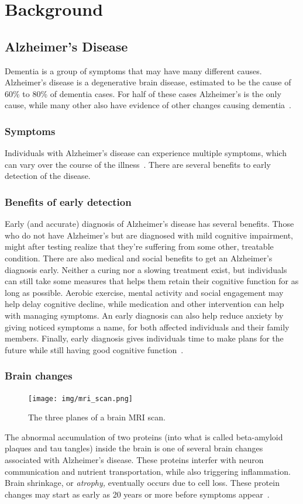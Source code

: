 \documentclass{kththesis}
\begin{document}
\chapter{Background}

\section{Alzheimer's Disease}

Dementia is a group of symptoms that may have many different causes. Alzheimer's disease is a degenerative brain disease, estimated to be the cause of 60\% to 80\% of dementia cases. For half of these cases Alzheimer's is the only cause, while many other also have evidence of other changes causing dementia~\cite{factsfigures2018}.

\subsection{Symptoms}
Individuals with Alzheimer's disease can experience multiple symptoms, which can vary over the course of the illness~\cite{factsfigures2018}. There are several benefits to early detection of the disease.

\subsection{Benefits of early detection}
Early (and accurate) diagnosis of Alzheimer's disease has several benefits. Those who do not have Alzheimer's but are diagnosed with mild cognitive impairment, might after testing realize that they're suffering from some other, treatable condition. There are also medical and social benefits to get an Alzheimer's diagnosis early. Neither a curing nor a slowing treatment exist, but individuals can still take some measures that helps them retain their cognitive function for as long as possible. Aerobic exercise, mental activity and social engagement may help delay cognitive decline, while medication and other intervention can help with managing symptoms. An early diagnosis can also help reduce anxiety by giving noticed symptoms a name, for both affected individuals and their family members. Finally, early diagnosis gives individuals time to make plans for the future while still having good cognitive function~\cite[p. 406-409]{factsfigures2018}.

\subsection{Brain changes}
\begin{figure}
  \centering
  \texttt{[image: img/mri\_scan.png]}
  \caption{The three planes of a brain MRI scan.}
\end{figure}
The abnormal accumulation of two proteins (into what is called beta-amyloid plaques and tau tangles) inside the brain is one of several brain changes associated with Alzheimer's disease. These proteins interfer with neuron communication and nutrient transportation, while also triggering inflammation. Brain shrinkage, or \textit{atrophy,} eventually occurs due to cell loss. These protein changes may start as early as 20 years or more before symptoms appear~\cite{factsfigures2018}.
\end{document}
